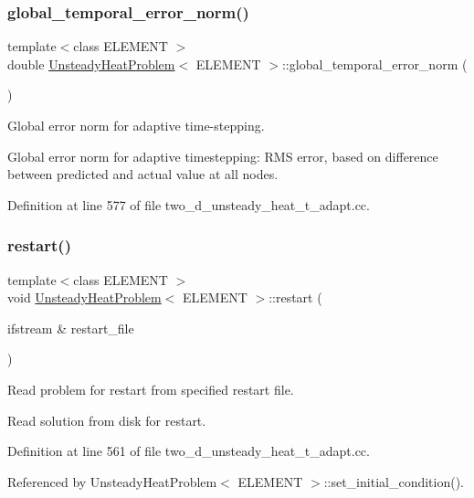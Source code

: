 \subsubsection{\texorpdfstring{global\+\_\+temporal\+\_\+error\+\_\+norm()}{global\_temporal\_error\_norm()}}
{\footnotesize\ttfamily template$<$class E\+L\+E\+M\+E\+NT $>$ \\
double \hyperlink{classUnsteadyHeatProblem}{Unsteady\+Heat\+Problem}$<$ E\+L\+E\+M\+E\+NT $>$\+::global\+\_\+temporal\+\_\+error\+\_\+norm (\begin{DoxyParamCaption}{ }\end{DoxyParamCaption})}



Global error norm for adaptive time-\/stepping. 

Global error norm for adaptive timestepping\+: R\+MS error, based on difference between predicted and actual value at all nodes. 

Definition at line 577 of file two\+\_\+d\+\_\+unsteady\+\_\+heat\+\_\+t\+\_\+adapt.\+cc.

\mbox{\label{classUnsteadyHeatProblem_ad0a4a1c1da24f6d62f64b0d40be31709}} 
\subsubsection{\texorpdfstring{restart()}{restart()}}
{\footnotesize\ttfamily template$<$class E\+L\+E\+M\+E\+NT $>$ \\
void \hyperlink{classUnsteadyHeatProblem}{Unsteady\+Heat\+Problem}$<$ E\+L\+E\+M\+E\+NT $>$\+::restart (\begin{DoxyParamCaption}\item[{ifstream \&}]{restart\+\_\+file }\end{DoxyParamCaption})}



Read problem for restart from specified restart file. 

Read solution from disk for restart. 

Definition at line 561 of file two\+\_\+d\+\_\+unsteady\+\_\+heat\+\_\+t\+\_\+adapt.\+cc.



Referenced by Unsteady\+Heat\+Problem$<$ E\+L\+E\+M\+E\+N\+T $>$\+::set\+\_\+initial\+\_\+condition().

